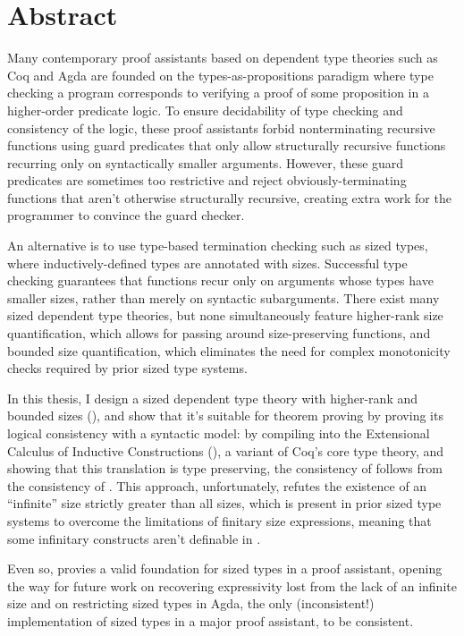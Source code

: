 \chapter{Abstract}

Many contemporary proof assistants based on dependent type theories such as Coq and Agda
are founded on the types-as-propositions paradigm where type checking a program
corresponds to verifying a proof of some proposition in a higher-order predicate logic.
To ensure decidability of type checking and consistency of the logic,
these proof assistants forbid nonterminating recursive functions
using guard predicates that only allow structurally recursive functions
recurring only on syntactically smaller arguments.
However, these guard predicates are sometimes too restrictive
and reject obviously-terminating functions that aren't otherwise structurally recursive,
creating extra work for the programmer to convince the guard checker.

An alternative is to use type-based termination checking such as sized types,
where inductively-defined types are annotated with sizes.
Successful type checking guarantees that functions recur only on arguments whose types have smaller sizes,
rather than merely on syntactic subarguments.
There exist many sized dependent type theories,
but none simultaneously feature higher-rank size quantification,
which allows for passing around size-preserving functions,
and bounded size quantification,
which eliminates the need for complex monotonicity checks required by prior sized type systems.

In this thesis, I design a sized dependent type theory with higher-rank and bounded sizes (\lang),
and show that it's suitable for theorem proving by proving its logical consistency with a syntactic model:
by compiling \lang into the Extensional Calculus of Inductive Constructions (\CICE),
a variant of Coq's core type theory,
and showing that this translation is type preserving,
the consistency of \lang follows from the consistency of \CICE.
This approach, unfortunately, refutes the existence of an ``infinite'' size strictly greater than all sizes,
which is present in prior sized type systems to overcome the limitations of finitary size expressions,
meaning that some infinitary constructs aren't definable in \lang.

Even so, \lang provies a valid foundation for sized types in a proof assistant,
opening the way for future work on recovering expressivity lost from the lack of an infinite size
and on restricting sized types in Agda,
the only (inconsistent!) implementation of sized types in a major proof assistant,
to be consistent.